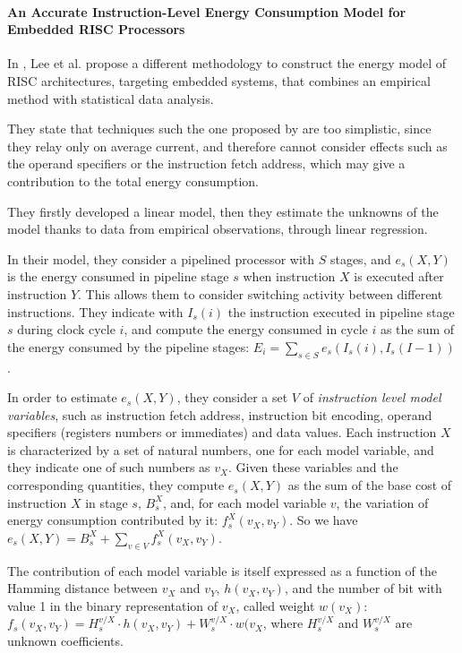 \paragraph{An Accurate Instruction-Level Energy Consumption Model for Embedded RISC Processors}
In \cite{lee}, Lee et al. propose a different methodology to construct the energy model of RISC architectures, targeting embedded systems, that combines an empirical method with statistical data analysis. \par
They state that techniques such the one proposed by \cite{tiwari} are too simplistic, since they relay only on average current, and therefore cannot consider effects such as the operand specifiers or the instruction fetch address, which may give a contribution to the total energy consumption. \par 
They firstly developed a linear model, then they estimate the unknowns of the model thanks to data from empirical observations, through linear regression. \par 
In their model, they consider a pipelined processor with $S$ stages, and $e_{s}(X,Y)$ is the energy consumed in pipeline stage $s$ when instruction $X$ is executed after instruction $Y$. This allows them to consider switching activity between different instructions. They indicate with $I_{s}(i)$ the instruction executed in pipeline stage $s$ during clock cycle $i$, and compute the energy consumed in cycle $i$ as the sum of the energy consumed by the pipeline stages: $E_{i} = \sum_{s \in S} e_{s}(I_{s}(i),I_{s}(I-1))$. \par 
In order to estimate $e_{s}(X,Y)$, they consider a set $V$ of \emph{instruction level model variables}, such as instruction fetch address, instruction bit encoding, operand specifiers (registers numbers or immediates) and data values. Each instruction $X$ is characterized by a set of natural numbers, one for each model variable, and they indicate one of such numbers as $v_{X}$. Given these variables and the corresponding quantities, they compute $e_{s}(X,Y)$ as the sum of the base cost of instruction $X$ in stage $s$, $B_{s}^{X}$, and, for each model variable $v$, the variation of energy consumption contributed by it: $f_{s}^{X}(v_{X}, v_{Y})$. So we have $e_{s}(X,Y) =  B_{s}^{X} + \sum_{v \in V}f_{s}^{X}(v_{X}, v_{Y})$. \par 
The contribution of each model variable is itself expressed as a function of the Hamming distance between $v_{X}$ and $v_{Y}$, $h(v_{X}, v_{Y})$, and the number of bit with value 1 in the binary representation of $v_{X}$, called weight $w(v_{X})$: $f_{s}(v_{X}, v_{Y}) = H_{s}^{v/X} \cdot h(v_{X}, v_{Y}) + W_{s}^{v/X} \cdot w(v_{X}$, where $H_{s}^{v/X}$ and $W_{s}^{v/X}$ are unknown coefficients. \par 
